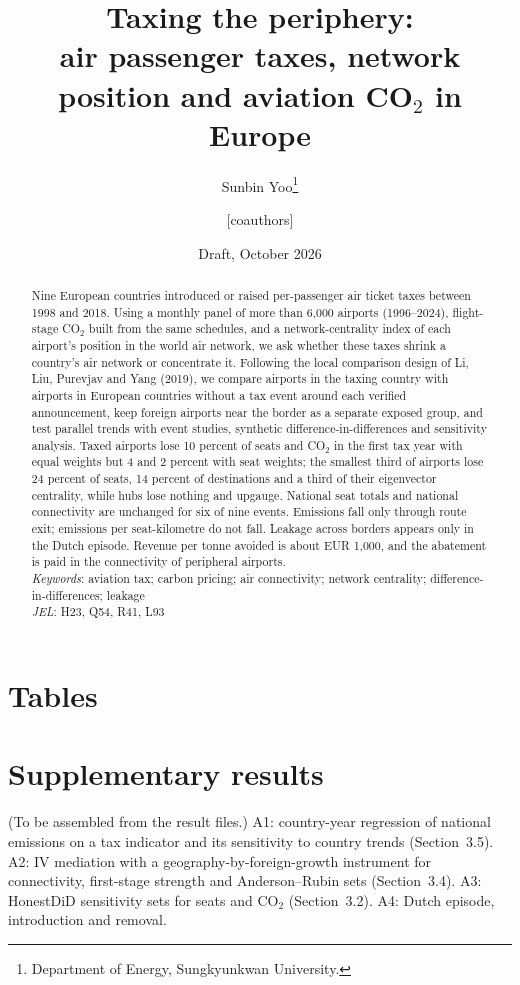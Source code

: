 \documentclass[11pt]{article}
\title{Taxing the periphery:\\ air passenger taxes, network position and aviation CO$_2$ in Europe}
\author{Sunbin Yoo\thanks{Department of Energy, Sungkyunkwan University.} \and [coauthors]}
\date{Draft, October 2026}
\begin{document}
\maketitle
\begin{abstract}
\noindent Nine European countries introduced or raised per-passenger air ticket taxes between 1998 and 2018.
Using a monthly panel of more than 6,000 airports (1996--2024), flight-stage CO$_2$ built from the same
schedules, and a network-centrality index of each airport's position in the world air network, we ask
whether these taxes shrink a country's air network or concentrate it. Following the local comparison
design of Li, Liu, Purevjav and Yang (2019), we compare airports in the taxing country with airports in
European countries without a tax event around each verified announcement, keep foreign airports near the
border as a separate exposed group, and test parallel trends with event studies, synthetic
difference-in-differences and sensitivity analysis. Taxed airports lose 10 percent of seats and CO$_2$ in
the first tax year with equal weights but 4 and 2 percent with seat weights; the smallest third of airports
lose 24 percent of seats, 14 percent of destinations and a third of their eigenvector centrality, while
hubs lose nothing and upgauge. National seat totals and national connectivity are unchanged for six of nine
events. Emissions fall only through route exit; emissions per seat-kilometre do not fall. Leakage across
borders appears only in the Dutch episode. Revenue per tonne avoided is about EUR 1,000, and the abatement
is paid in the connectivity of peripheral airports.\\[4pt]
\textit{Keywords}: aviation tax; carbon pricing; air connectivity; network centrality; difference-in-differences; leakage\\
\textit{JEL}: H23, Q54, R41, L93
\end{abstract}


\clearpage
\section*{Tables}

\clearpage
\appendix
\section{Supplementary results}
\label{app:extra}
\noindent (To be assembled from the result files.) A1: country-year regression of national emissions on a tax
indicator and its sensitivity to country trends (Section~3.5). A2: IV mediation with a geography-by-foreign-growth
instrument for connectivity, first-stage strength and Anderson--Rubin sets (Section~3.4). A3: HonestDiD sensitivity
sets for seats and CO$_2$ (Section~3.2). A4: Dutch episode, introduction and removal.


\end{document}
